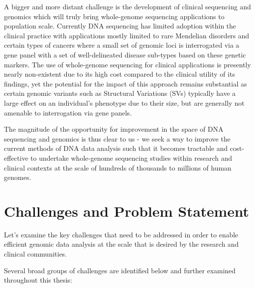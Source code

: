 A bigger and more distant challenge is the development of clinical sequencing and genomics which will truly bring whole-genome sequencing applications to population scale. Currently DNA sequencing has limited adoption within the clinical practice with applications mostly limited to rare Mendelian disorders\autocite{lee2014clinical} and certain types of cancers\autocite{robinson2015integrative} where a small set of genomic loci is interrogated via a gene panel\autocite{allegra2009american} with a set of well-delineated disease sub-types based on these genetic markers. The use of whole-genome sequencing for clinical applications is presently nearly non-existent due to its high cost compared to the clinical utility of its findings, yet the potential for the impact of this approach remains substantial as certain genomic variants such as Structural Variations (SVs) typically have a large effect on an individual's phenotype due to their size\autocite{pleasance2010comprehensive}, but are generally not amenable to interrogation via gene panels.

The magnitude of the opportunity for improvement in the space of DNA sequencing and genomics is thus clear to us - we seek a way to improve the current methods of DNA data analysis such that it becomes tractable and cost-effective to undertake whole-genome sequencing studies within research and clinical contexts at the scale of hundreds of thousands to millions of human genomes.        

\section{Challenges and Problem Statement}
\label{sec:challenges}

Let's examine the key challenges that need to be addressed in order to enable efficient genomic data analysis at the scale that is desired by the research and clinical communities.

Several broad groups of challenges are identified below and further examined throughout this thesis:

